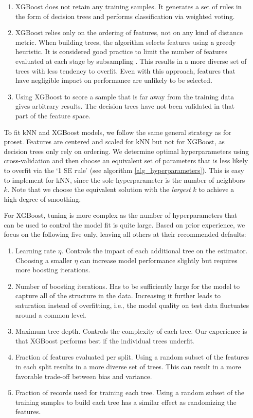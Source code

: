 \begin{enumerate}
\item XGBoost does not retain any training samples.
It generates a set of rules in the form of decision trees and performs classification via weighted voting.
%
\item XGBoost relies only on the ordering of features, not on any kind of distance metric.
When building trees, the algorithm selects features using a greedy heuristic.
It is considered good practice to limit the number of features evaluated at each stage by subsampling \cite{Chen_16}.
This results in a more diverse set of trees with less tendency to overfit.
Even with this approach, features that have negligible impact on performance are unlikely to be selected.
%
\item Using XGBoost to score a sample that is far away from the training data gives arbitrary results.
The decision trees have not been validated in that part of the feature space.
\end{enumerate}
%
To fit kNN and XGBoost models, we follow the same general strategy as for proset.
Features are centered and scaled for kNN but not for XGBoost, as decision trees only rely on ordering.
We determine optimal hyperparameters using cross-validation and then choose an equivalent set of parameters that is less likely to overfit via the `1 SE rule' (see algorithm \ref{alg_hyperparameters}).
This is easy to implement for kNN, since the sole hyperparameter is the number of neighbors $k$.
Note that we choose the equivalent solution with the \textit{largest} $k$ to achieve a high degree of smoothing.\par
%
For XGBoost, tuning is more complex as the number of hyperparameters that can be used to control the model fit is quite large.
Based on prior experience, we focus on the following five only, leaving all others at their recommended defaults:
%
\begin{enumerate}
\item Learning rate $\eta$.
Controls the impact of each additional tree on the estimator.
Choosing a smaller $\eta$ can increase model performance slightly but requires more boosting iterations.
%
\item Number of boosting iterations.
Has to be sufficiently large for the model to capture all of the structure in the data.
Increasing it further leads to saturation instead of overfitting, i.e., the model quality on test data fluctuates around a common level.
%
\item Maximum tree depth.
Controls the complexity of each tree.
Our experience is that XGBoost performs best if the individual trees underfit.
%
\item Fraction of features evaluated per split.
Using a random subset of the features in each split results in a more diverse set of trees.
This can result in a more favorable trade-off between bias and variance.
%
\item Fraction of records used for training each tree.
Using a random subset of the training samples to build each tree has a similar effect as randomizing the features.
\end{enumerate}
